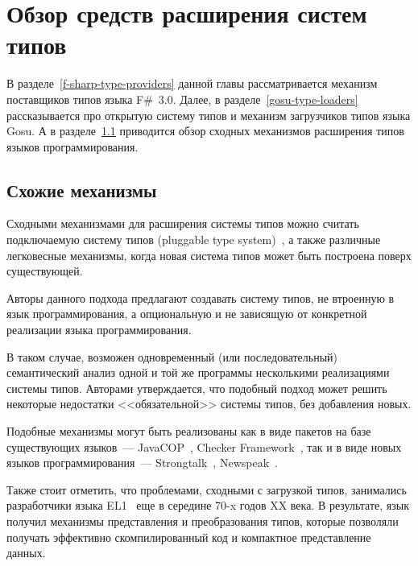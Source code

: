 \section{Обзор средств расширения систем типов}
В разделе~\ref{f-sharp-type-providers} данной главы рассматривается механизм поставщиков типов языка F\#~3.0. Далее, в разделе~\ref{gosu-type-loaders} рассказывается про открытую систему типов и механизм загрузчиков типов языка Gosu. А в разделе~\ref{similar-mechanisms} приводится обзор сходных механизмов расширения типов языков программирования.




\subsection{Схожие механизмы}\label{similar-mechanisms}
Сходными механизмами для расширения системы типов можно считать подключаемую систему типов (pluggable type system)~\cite{bracha}, а также различные легковесные механизмы, когда новая система типов может быть построена поверх существующей.

Авторы данного подхода предлагают создавать систему типов, не втроенную в язык программирования, а опциональную и не зависящую от конкретной реализации языка программирования.

В таком случае, возможен одновременный (или последовательный) семантический анализ одной и той же программы несколькими реализациями системы типов. Авторами утверждается, что подобный подход может решить некоторые недостатки <<обязательной>> системы типов, без добавления новых.

Подобные механизмы могут быть реализованы как в виде пакетов на базе существующих языков~--- JavaCOP~\cite{javacop2010}, Checker Framework~\cite{checkerframework2008},
так и в виде новых языков программирования~--- Strongtalk~\cite{strongtalk1993}, Newspeak~\cite{newspeak2008}.

Также стоит отметить, что проблемами, сходными с загрузкой типов, занимались разработчики языка EL1~\cite{el1} еще в середине 70-x годов XX века.
В результате, язык получил механизмы представления и преобразования типов, которые позволяли получать эффективно скомпилированный код и компактное представление данных.